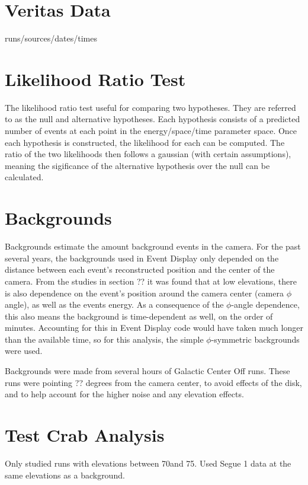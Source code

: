 \section{Veritas Data}
runs/sources/dates/times

\section{Likelihood Ratio Test}
The likelihood ratio test useful for comparing two hypotheses.
They are referred to as the null and alternative hypotheses.
Each hypothesis consists of a predicted number of events at each point in the energy/space/time parameter space.
Once each hypothesis is constructed, the likelihood for each can be computed.
The ratio of the two likelihoods then follows a gaussian (with certain assumptions), meaning the sigificance of the alternative hypothesis over the null can be calculated.

\section{Backgrounds}

Backgrounds estimate the amount background events in the camera.
For the past several years, the backgrounds used in Event Display only depended on the distance between each event's reconstructed position and the center of the camera.
From the studies in section ?? it was found that at low elevations, there is also dependence on the event's position around the camera center (camera $\phi$ angle), as well as the events energy.
As a consequence of the $\phi$-angle dependence, this also means the background is time-dependent as well, on the order of minutes.
Accounting for this in Event Display code would have taken much longer than the available time, so for this analysis, the simple $\phi$-symmetric backgrounds were used.

Backgrounds were made from several hours of Galactic Center Off runs.
These runs were pointing ?? degrees from the camera center, to avoid effects of the disk, and to help account for the higher noise and any elevation effects.

\section{Test Crab Analysis}

Only studied runs with elevations between 70\degree and 75\degree.
Used Segue 1 data at the same elevations as a background.

